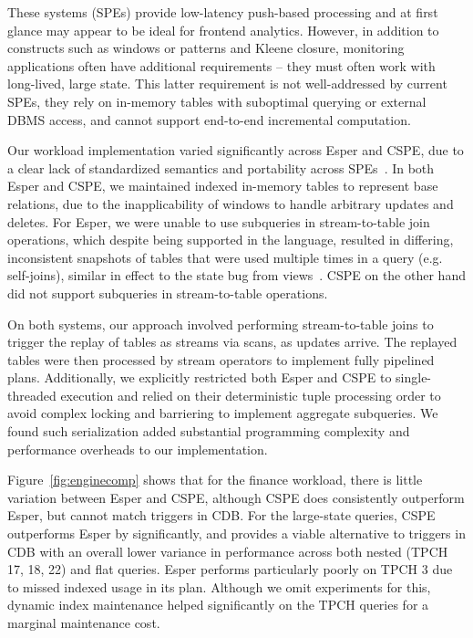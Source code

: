 \vspace{1mm}
These systems (SPEs) provide low-latency push-based processing and at first
glance may appear to be ideal for frontend analytics. However, in addition to
constructs such as windows or patterns and Kleene closure, monitoring
applications often have additional requirements -- they must often work with
long-lived, large state. This latter requirement is not well-addressed by
current SPEs, they rely on in-memory tables with suboptimal querying or
external DBMS access, and cannot support end-to-end incremental computation.

Our workload implementation varied significantly across Esper and CSPE, due to a
clear lack of standardized semantics and portability across
SPEs~\cite{botan-pvldb:10,jain-pvldb:08}.
In both Esper and CSPE, we maintained indexed in-memory tables to represent base
relations, due to the inapplicability of windows to handle arbitrary updates and
deletes.
For Esper, we were unable to use subqueries in stream-to-table join operations,
which despite being supported in the language, resulted in differing,
inconsistent snapshots of tables that were used multiple times in a query (e.g.
self-joins), similar in effect to the state bug from
views~\cite{colby-sigmod:96}.
CSPE on the other hand did not support subqueries in stream-to-table operations.

On both systems, our approach involved performing stream-to-table joins to
trigger the replay of tables as streams via scans, as updates arrive. The
replayed tables were then processed by stream operators to implement fully
pipelined plans.
Additionally, we explicitly restricted both Esper and CSPE to single-threaded
execution and relied on their deterministic tuple processing order to avoid
complex locking and barriering to implement aggregate subqueries. We found such
serialization added substantial programming complexity and performance overheads
to our implementation.

Figure~\ref{fig:enginecomp} shows that for the finance workload, there is little
variation between Esper and CSPE, although CSPE does consistently outperform
Esper, but cannot match triggers in CDB. For the large-state queries, CSPE
outperforms Esper by significantly, and provides a viable alternative to
triggers in CDB with an overall lower variance in performance across both
nested (TPCH 17, 18, 22) and flat queries. Esper performs particularly poorly on
TPCH 3 due to missed indexed usage in its plan. Although we omit experiments for
this, dynamic index maintenance helped significantly on the TPCH queries for a
marginal maintenance cost.
